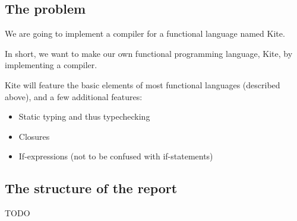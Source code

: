 \subsection{The problem}
We are going to implement a compiler for a functional language named Kite. 

In short, we want to make our own functional programming language, Kite, by implementing a compiler.


Kite will feature the basic elements of most functional languages (described above), and a few additional features:

\begin{itemize}

\item Static typing and thus typechecking
\item Closures
\item If-expressions (not to be confused with if-statements)

\end{itemize}

\subsection{The structure of the report}
TODO
